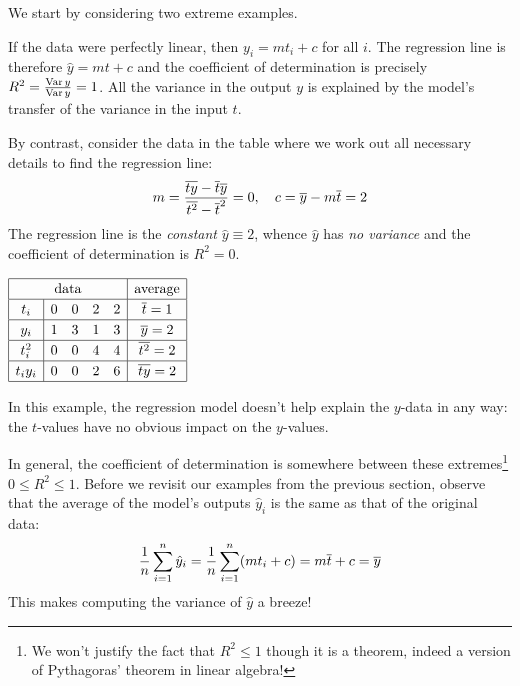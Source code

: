 \begin{examples}{}{}
We start by considering two extreme examples.\vspace{-1pt}
\begin{enumerate}
  \item If the data were perfectly linear, then $y_i=mt_i+c$ for all $i$. The regression line is therefore $\hat y=mt+c$ and the coefficient of determination is precisely $R^2=\frac{\operatorname{Var} y}{\operatorname{Var} y}=1$. All the variance in the output $y$ is explained by the model's transfer of the variance in the input $t$.\par
\begin{minipage}[t]{0.6\linewidth}\vspace{0pt}
  \item By contrast, consider the data in the table where we work out all necessary details to find the regression line:
  \[
  m=\frac{\overline{ty}-\overline{t}\overline{y}}{\overline{t^2}-\overline{t}^2}=0,\quad c=\overline{y}-m\overline{t}=2
  \]
  The regression line is the \emph{constant} $\hat y\equiv 2$, whence $\hat y$ has \emph{no variance} and the coefficient of determination is $R^2=0$.
\end{minipage}\hfill\begin{minipage}[t]{0.39\linewidth}\vspace{0pt}
	\flushright
	$\renewcommand{\arraystretch}{1.2}
\begin{array}{|c|cccc|c|}
\hline
\multicolumn{5}{|c|}{\text{data}}&\text{average}\\\hline
t_i&0&0&2&2&\cl t=1\\\hline
y_i&1&3&1&3&\cl y=2\\\hline
t_i^2&0&0&4&4&\cl{t^2}=2\\\hline
t_iy_i&0&0&2&6&\cl{ty}=2\\\hline%
\end{array}$
\end{minipage}\par
	In this example, the regression model doesn't help explain the $y$-data in any way: the $t$-values have no obvious impact on the $y$-values.
\end{enumerate}
\end{examples}
\goodbreak

In general, the coefficient of determination is somewhere between these extremes\footnote{We won't justify the fact that $R^2\le 1$ though it is a theorem, indeed a version of Pythagoras' theorem in linear algebra!} $0\le R^2\le 1$. Before we revisit our examples from the previous section, observe that the average of the model's outputs $\hat y_i$ is the same as that of the original data:
\[\frac 1n\sum_{i=1}^n\hat y_i=\frac 1n\sum_{i=1}^n(mt_i+c)=m\overline{t}+c=\overline{y}\]
This makes computing the variance of $\hat y$ a breeze!


